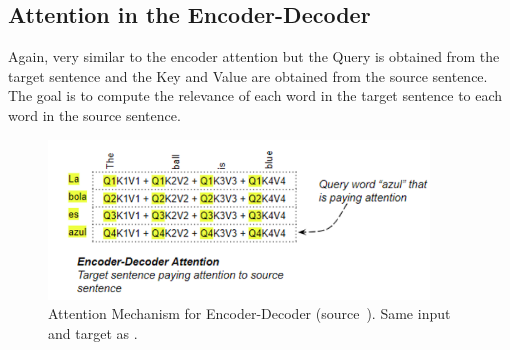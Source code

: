 \subsection{Attention in the Encoder-Decoder}
Again, very similar to the encoder attention but the Query is obtained from the target sentence and the Key and Value are obtained from the
source sentence. The goal is to compute the relevance of each word in the target sentence to each word in the source sentence.
\begin{figure}[H]
	\centering
	\includegraphics[width=0.9\textwidth]{figures/encoder_decoder_atn.png}
	\caption{Attention Mechanism for Encoder-Decoder (source~\autocite{doshiTransformersExplainedVisually2021b}). Same input
		and target as .}
	\label{fig:atn_encoder_decoder}
\end{figure}